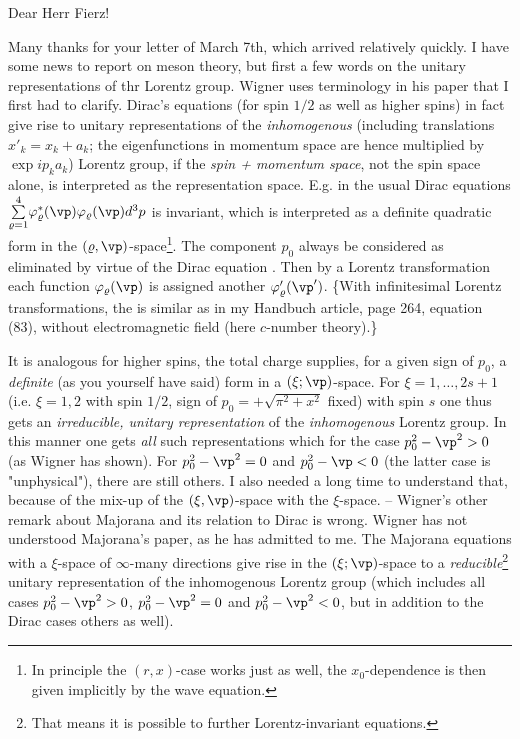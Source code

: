 \date{March 29, 1941}


Dear Herr Fierz!

Many thanks for your letter of March 7th, which arrived relatively quickly. I have some news to report on meson theory, but first a few words on the unitary representations of thr Lorentz group. Wigner uses terminology in his paper that I first had to clarify. Dirac's equations (for spin $1/2$ as well as higher spins) in fact give rise to unitary representations of the \textit{inhomogenous} (including translations $x'_k = x_k + a_k$; the eigenfunctions in momentum space are hence multiplied by $\exp{ip_ka_k}$) Lorentz group, if the \textit{spin + momentum space}, not the spin space alone, is interpreted as the representation space. E.g. in the usual Dirac equations $\sumXY{\varrho=1}{4}\varphi^*_\varrho(\vp)\varphi_\varrho(\vp)d^3p$ is invariant, which is interpreted as a definite quadratic form in the $(\varrho, \vp)$-space\footnote{In principle the $(r,x)$-case works just as well, the $x_0$-dependence is then given implicitly by the wave equation.}. The component $p_0$ always be considered as eliminated by virtue of the Dirac equation . Then by a Lorentz transformation each function $\varphi_\varrho(\vp)$ is assigned another $\varphi'_\varrho(\vp')$. \{With infinitesimal Lorentz transformations, the  is similar as in my Handbuch article, page 264, equation (83), without electromagnetic field (here $c$-number theory).\}

It is analogous for higher spins, the total charge supplies, for a given sign of $p_0$, a \textit{definite} (as you yourself have said) form in a $(\xi; \vp)$-space. For $\xi = 1, \dots,2s+1$ (i.e. $\xi=1,2$ with spin $1/2$, sign of $p_0=+\sqrt{\pi^2+x^2}$ fixed) with spin $s$ one thus gets an \textit{irreducible, unitary representation} of the \textit{inhomogenous} Lorentz group. In this manner one gets \textit{all} such representations which for the case $p_0^2 - \vp^2 > 0$ (as Wigner has shown). For $p_0^2 - \vp^2 = 0$ and $p_0^2 - \vp < 0$ (the latter case is "unphysical"), there are still others. I also needed a long time to understand that, because of the mix-up of the $(\xi, \vp)$-space with the $\xi$-space. -- Wigner's other remark about Majorana and its relation to Dirac is wrong. Wigner has not understood Majorana's paper, as he has admitted to me. The Majorana equations with a $\xi$-space of $\infty$-many directions give rise in the $(\xi; \vp)$-space to a \textit{reducible}\footnote{That means it is possible to  further Lorentz-invariant equations.} unitary representation of the inhomogenous Lorentz group (which includes all cases $p_0^2 - \vp^2 > 0$, $p_0^2 - \vp^2 = 0$ and $p_0^2 - \vp^2 < 0$, but in addition to the Dirac cases others as well).

